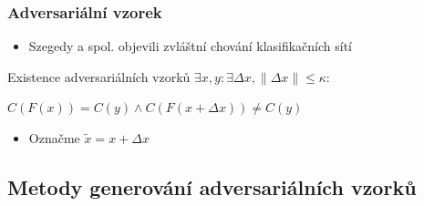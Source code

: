 \documentclass[czech]{beamer}
\begin{document}
\begin{frame}
    \frametitle{Adversariální vzorek}
    \begin{itemize}
        \item Szegedy a spol. objevili zvláštní chování klasifikačních sítí \cite{szegedy2014intriguing}
    \end{itemize}
    \begin{block}{Existence adversariálních vzorků}
        \centering
        $\exists x, y : \exists \Delta x, \|\Delta x\| \leq \kappa : $

        $C(F(x)) = C(y) \land C(F(x + \Delta x)) \neq C(y)$
    \end{block}
    \begin{itemize}
        \item Označme $\tilde{x} = x + \Delta x$
    \end{itemize}
\end{frame}

\subsection{Metody generování adversariálních vzorků}
\end{document}
